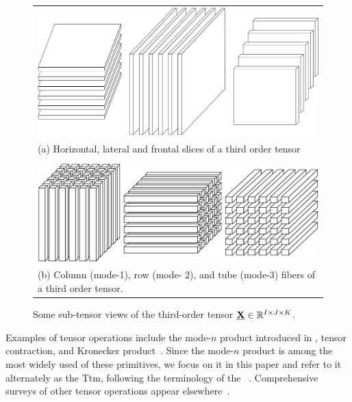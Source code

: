 \begin{figure}[htbp]
    \centering
    \begin{tabular}{>{\centering\arraybackslash}p{}}
    \includegraphics[width=0.55\linewidth]{figs/slices_own} \\
    (a) Horizontal, lateral and frontal slices of a third order tensor \\\\
    \includegraphics[scale=0.2]{figs/fibers_own} \\
    (b) Column (mode-1), row (mode- 2), and tube (mode-3) fibers of a third order tensor. \\
    \end{tabular}
    \caption{Some sub-tensor views of the third-order tensor $\T{X} \in \R^{I \times J \times K}$.}
    \label{fig:tensor-example}
\end{figure}

Examples of tensor operations include the mode-$n$ product introduced in , tensor contraction, and Kronecker product~\cite{Kolda:2009}.
Since the mode-$n$ product is among the most widely used of these primitives, we focus on it in this paper and refer to it alternately as the \acf{Ttm}, following the terminology of the \TensorToolbox~\cite{TTB_Software}.
Comprehensive surveys of other tensor operations appear elsewhere~\cite{Kolda:2009,CICHOCKI:2014}.

